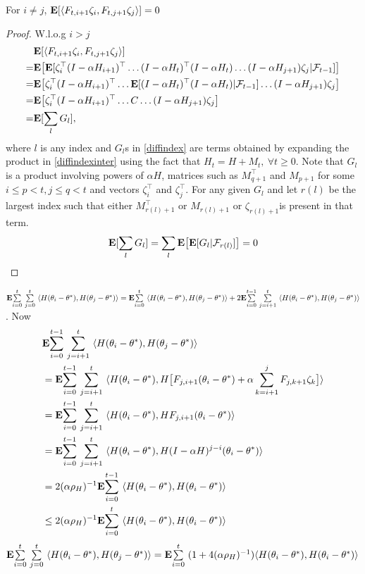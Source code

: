\begin{lemma}
For $i\neq j$, $\E[\ip{F_{t,i+1}\zeta_{i},F_{t,j+1} \zeta_{j}}]=0$
\end{lemma}
\begin{proof}
W.l.o.g  $i>j$
\begin{align}
&\E[\ip{F_{t,i+1} \zeta_{i},F_{t,j+1} \zeta_{j}}]\nn\\
\label{diffindexinter}=&\E\big[\E[ \zeta^\top_{i}(I-\alpha H_{i+1})^\top\ldots(I-\alpha H_t)^\top(I-\alpha H_t)\ldots(I-\alpha H_{j+1}) \zeta_{j}|\F_{t-1}]\big]\\
=&\E\big[ \zeta^\top_{i}(I-\alpha H_{i+1})^\top\ldots\E[(I-\alpha H_t)^\top(I-\alpha H_t)|\F_{t-1}]\ldots(I-\alpha H_{j+1}) \zeta_{j}\big]\\
=&\E\big[ \zeta^\top_{i}(I-\alpha H_{i+1})^\top\ldots C\ldots(I-\alpha H_{j+1}) \zeta_{j}\big]\\
\label{diffindex}=&\E[ \sum_{l} G_l],
\end{align}
where $l$ is any index and $G_l$s in \eqref{diffindex} are terms obtained by expanding the product in \eqref{diffindexinter} using the fact that $H_t=H+M_{t},~\forall t\geq 0$. Note that $G_l$ is a product involving powers of $\alpha H$, matrices such as $M^\top_{q+1}$ and $M_{p+1}$ for some $ i\leq p<t, j\leq q < t$ and vectors $\zeta^\top_i$ and $\zeta^\top_j$.
For any given $G_l$ and let $r(l)$ be the largest index such that either $M^\top_{r(l)+1}$ or $M_{r(l)+1}$ or $\zeta_{r(l)+1}$is present in that term.
\begin{align*}
\E[ \sum_{l} G_l]=  \sum_{l} \E\big[\E[G_l|\F_{r(l)}]\big]=0
\end{align*}
\end{proof}
$\E\ous{\sum}{i=0}{t}\ous{\sum}{j=0}{t}\ip{H(\theta_i-\theta^*),H(\theta_j-\theta^*)}=\E\ous{\sum}{i=0}{t}\ip{H(\theta_i-\theta^*),H(\theta_j-\theta^*)}+ 2\E\ous{\sum}{i=0}{t-1}\ous{\sum}{j=i+1}{t}\ip{H(\theta_i-\theta^*),H(\theta_j-\theta^*)}$. Now
\begin{align}\label{inter}
&\E\ous{\sum}{i=0}{t-1}\ous{\sum}{j=i+1}{t}\ip{H(\theta_i-\theta^*),H(\theta_j-\theta^*)}\nn\\
&=\E\ous{\sum}{i=0}{t-1}\ous{\sum}{j=i+1}{t}\ip{H(\theta_i-\theta^*),H\big[F_{j,i+1} (\theta_i-\theta^*)+\alpha\sum_{k=i+1}^j F_{j,k+1}\zeta_{k}\big]}\nn\\
&=\E\ous{\sum}{i=0}{t-1}\ous{\sum}{j=i+1}{t}\ip{H(\theta_i-\theta^*),H F_{j,i+1} (\theta_i-\theta^*)}\nn\\
&=\E\ous{\sum}{i=0}{t-1}\ous{\sum}{j=i+1}{t}\ip{H(\theta_i-\theta^*),H(I-\alpha H)^{j-i} (\theta_i-\theta^*)}\nn\\
&=2(\alpha\rho_H)^{-1}\E\ous{\sum}{i=0}{t-1}\ip{H(\theta_i-\theta^*),H (\theta_i-\theta^*)}\nn\\
&\leq2(\alpha\rho_H)^{-1}\E\ous{\sum}{i=0}{t}\ip{H(\theta_i-\theta^*),H (\theta_i-\theta^*)}\nn\\
\end{align}
$\E\ous{\sum}{i=0}{t}\ous{\sum}{j=0}{t}\ip{H(\theta_i-\theta^*),H(\theta_j-\theta^*)}=\E\ous{\sum}{i=0}{t}(1+4(\alpha\rho_H)^{-1})\ip{H(\theta_i-\theta^*),H(\theta_i-\theta^*)}$

